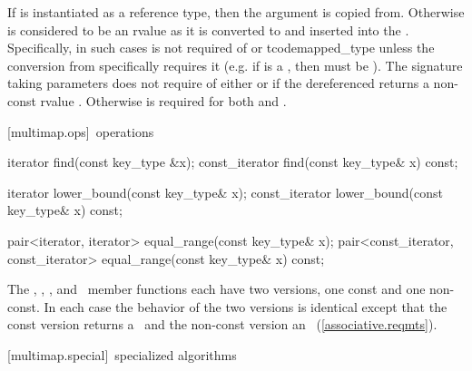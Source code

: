 \documentclass[american,twoside]{book}
\begin{document}
\begin{itemdescr}
\pnum
{}

If  is instantiated as a reference type, then
the argument  is copied from. Otherwise 
is considered to be an rvalue as it is converted to
 and inserted into the .
Specifically, in such cases  is not required of
 or tcode{mapped_type}
unless the conversion from  specifically
requires it (e.g. if  is a 
, then
 must be ).
The signature taking 
parameters does not require 
of either  or
 if the dereferenced 
returns a non-const rvalue
. Otherwise
 is required for
both  and .
\end{itemdescr}

[multimap.ops]{\ operations}

\begin{itemdecl}
iterator       find(const key_type &x);
const_iterator find(const key_type& x) const;

iterator       lower_bound(const key_type& x);
const_iterator lower_bound(const key_type& x) const;

pair<iterator, iterator>
  equal_range(const key_type& x);
pair<const_iterator, const_iterator>
  equal_range(const key_type& x) const;
\end{itemdecl}

\begin{itemdescr}
\pnum
The
,
,
,
and
\
member functions each have two versions, one const and one non-const.
In each case the behavior of the two versions is identical
except that the const version returns a
\
and the non-const version an
\
(\ref{associative.reqmts}).
\end{itemdescr}

[multimap.special]{\ specialized algorithms}
\end{document}
